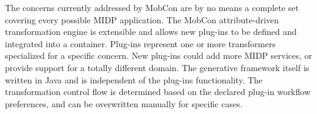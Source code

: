 The concerns currently addressed by MobCon are by no means a complete set covering every possible MIDP application. The MobCon attribute-driven transformation engine is extensible and allows new plug-ins to be defined and integrated into a container. Plug-ins represent one or more transformers specialized for a specific concern. New plug-ins could add more MIDP services, or provide support for a totally different domain. The generative framework itself is written in Java and is independent of the plug-ins functionality. The transformation control flow is determined based on the declared plug-in workflow preferences, and can be overwritten manually for specific cases.

 
